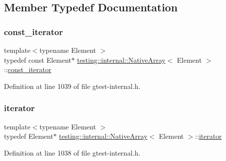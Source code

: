 \subsection{Member Typedef Documentation}
\mbox{\label{classtesting_1_1internal_1_1NativeArray_a9ce7c8408460d7158a2870456d134557}} 
\subsubsection{\texorpdfstring{const\+\_\+iterator}{const\_iterator}}
{\footnotesize\ttfamily template$<$typename Element $>$ \\
typedef const Element$\ast$ \hyperlink{classtesting_1_1internal_1_1NativeArray}{testing\+::internal\+::\+Native\+Array}$<$ Element $>$\+::\hyperlink{classtesting_1_1internal_1_1NativeArray_a9ce7c8408460d7158a2870456d134557}{const\+\_\+iterator}}



Definition at line 1039 of file gtest-\/internal.\+h.

\mbox{\label{classtesting_1_1internal_1_1NativeArray_ac1301a57977b57a1ad013e4e25fc2a72}} 
\subsubsection{\texorpdfstring{iterator}{iterator}}
{\footnotesize\ttfamily template$<$typename Element $>$ \\
typedef Element$\ast$ \hyperlink{classtesting_1_1internal_1_1NativeArray}{testing\+::internal\+::\+Native\+Array}$<$ Element $>$\+::\hyperlink{classtesting_1_1internal_1_1NativeArray_ac1301a57977b57a1ad013e4e25fc2a72}{iterator}}



Definition at line 1038 of file gtest-\/internal.\+h.

\mbox{\label{classtesting_1_1internal_1_1NativeArray_a12216d686e16e4cc63d952fada5b2ba9}} 
